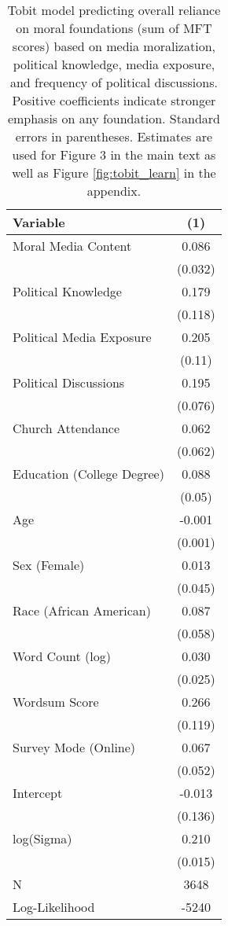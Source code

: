 \begin{table}[ht]
\centering
\caption{Tobit model predicting overall reliance on moral foundations
           (sum of MFT scores) based on media moralization, political knowledge, media exposure, and frequency of 
           political discussions. Positive coefficients indicate stronger emphasis on any foundation.
           Standard errors in parentheses. Estimates are used for Figure 3 in 
           the main text as well as Figure \ref{fig:tobit_learn} in the appendix.} 
\label{tab:tobit_learn}
\begingroup\footnotesize
\begin{tabular}{lc}
  \hline
Variable & (1) \\ 
  \hline
Moral Media Content &  0.086 \\ 
   & (0.032) \\ 
  Political Knowledge &  0.179 \\ 
   & (0.118) \\ 
  Political Media Exposure &  0.205 \\ 
   & (0.11) \\ 
  Political
Discussions &  0.195 \\ 
   & (0.076) \\ 
  Church Attendance &  0.062 \\ 
   & (0.062) \\ 
  Education (College Degree) &  0.088 \\ 
   & (0.05) \\ 
  Age & -0.001 \\ 
   & (0.001) \\ 
  Sex (Female) &  0.013 \\ 
   & (0.045) \\ 
  Race (African American) &  0.087 \\ 
   & (0.058) \\ 
  Word Count (log) &  0.030 \\ 
   & (0.025) \\ 
  Wordsum Score &  0.266 \\ 
   & (0.119) \\ 
  Survey Mode (Online) &  0.067 \\ 
   & (0.052) \\ 
  Intercept & -0.013 \\ 
   & (0.136) \\ 
  log(Sigma) &  0.210 \\ 
   & (0.015) \\ 
   \hline
N & 3648 \\ 
  Log-Likelihood & -5240 \\ 
   \hline
\end{tabular}
\endgroup
\end{table}
